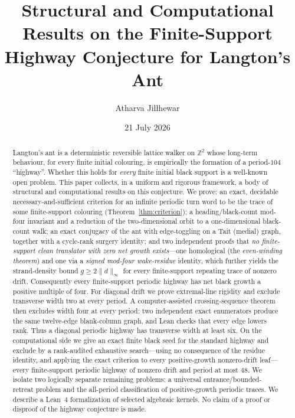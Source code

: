 \documentclass[11pt,reqno]{amsart}
\title[Finite-support Langton ant]{Structural and Computational Results on the Finite-Support Highway Conjecture for Langton's Ant}
\author{Atharva Jillhewar}
\date{21 July 2026}
\theoremstyle{plain}
\theoremstyle{definition}
\newcommand{\Z}{\mathbb{Z}}
\newcommand{\drift}{d}
\newcommand{\growth}{g}
\begin{document}
\begin{abstract}
Langton's ant is a deterministic reversible lattice walker on $\Z^2$ whose
long-term behaviour, for every finite initial colouring, is empirically the
formation of a period-$104$ ``highway''. Whether this holds for \emph{every}
finite initial black support is a well-known open problem. This paper collects,
in a uniform and rigorous framework, a body of structural and computational
results on this conjecture. We prove: an exact, decidable
necessary-and-sufficient criterion for an infinite periodic turn word to be the
trace of some finite-support colouring (Theorem~\ref{thm:criterion}); a
heading/black-count mod-four invariant and a reduction of the two-dimensional
orbit to a one-dimensional black-count walk; an exact conjugacy of the ant with
edge-toggling on a Tait (medial) graph, together with a cycle-rank surgery
identity; and two independent proofs that \emph{no finite-support clean
translator with zero net growth exists}---one homological (the
\emph{even-winding theorem}) and one via a \emph{signed mod-four wake-residue}
identity, which further yields the strand-density bound $\growth\ge
2\|\drift\|_\infty$ for every finite-support repeating trace of nonzero drift.
Consequently every
finite-support periodic highway has net black growth a positive multiple of
four.  For diagonal drift we prove extremal-line rigidity and exclude transverse
width two at every period.  A computer-assisted crossing-sequence theorem then
excludes width four at every period: two independent exact enumerators produce the
same twelve-edge blank-column graph, and Lean checks that every edge lowers rank.
Thus a diagonal periodic highway has transverse width at least six. On the
computational side we give an exact finite black seed for the
standard highway and exclude by a rank-audited exhaustive search---using no
consequence of the residue identity, and
applying the exact criterion to every positive-growth nonzero-drift leaf---every
finite-support periodic highway of nonzero drift and period at most $48$. We
isolate two logically separate remaining problems: a universal
entrance/bounded-retreat problem and the all-period classification of
positive-growth periodic traces. We describe a Lean~4 formalization of selected
algebraic kernels. No
claim of a proof or disproof of the highway conjecture is made.
\end{abstract}

\maketitle
\end{document}
